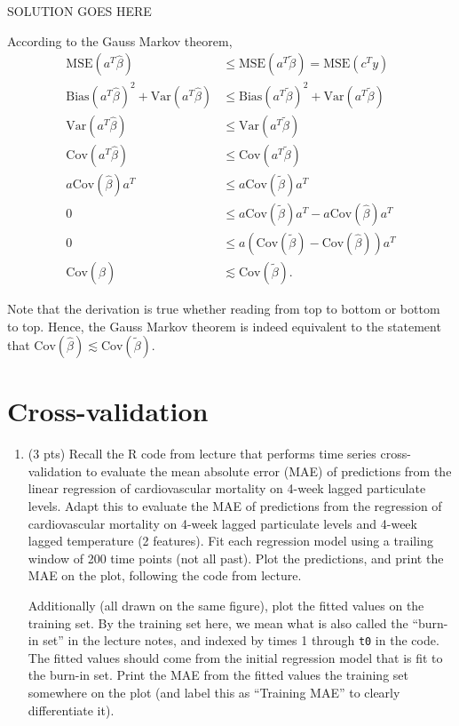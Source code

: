 \documentclass[
]{article}
\begin{document}
SOLUTION GOES HERE

According to the Gauss Markov theorem, \begin{align*}
  \mathrm{MSE}(a^T\hat{\beta}) & \le \mathrm{MSE}(a^T\tilde{\beta}) = \mathrm{MSE}(c^Ty) \\
  \mathrm{Bias}(a^T\hat\beta)^2 + \mathrm{Var}(a^T\hat{\beta}) & \le \mathrm{Bias}(a^T\tilde{\beta})^2 + \mathrm{Var}(a^T\tilde{\beta}) \\
  \mathrm{Var}(a^T\hat{\beta}) & \le \mathrm{Var}(a^T\tilde{\beta}) \\
  \mathrm{Cov}(a^T\hat{\beta}) & \le \mathrm{Cov}(a^T\tilde{\beta}) \\
  a\mathrm{Cov}(\hat{\beta})a^T & \le a\mathrm{Cov}(\tilde{\beta})a^T \\
  0 & \le a\mathrm{Cov}(\tilde{\beta})a^T - a\mathrm{Cov}(\hat{\beta})a^T \\
  0 & \le a\left(\mathrm{Cov}(\tilde{\beta}) - \mathrm{Cov}(\hat{\beta})\right)a^T \\
  \mathrm{Cov}(\hat\beta) & \lesssim \mathrm{Cov}(\tilde\beta).
\end{align*}

Note that the derivation is true whether reading from top to bottom or
bottom to top. Hence, the Gauss Markov theorem is indeed equivalent to
the statement that
\(\mathrm{Cov}(\hat\beta) \lesssim \mathrm{Cov}(\tilde\beta)\).

\hypertarget{cross-validation}{%
\section{Cross-validation}\label{cross-validation}}

\begin{enumerate}
\def\labelenumi{\arabic{enumi}.}
\setcounter{enumi}{11}
\item
  (3 pts) Recall the R code from lecture that performs time series
  cross-validation to evaluate the mean absolute error (MAE) of
  predictions from the linear regression of cardiovascular mortality on
  4-week lagged particulate levels. Adapt this to evaluate the MAE of
  predictions from the regression of cardiovascular mortality on 4-week
  lagged particulate levels and 4-week lagged temperature (2 features).
  Fit each regression model using a trailing window of 200 time points
  (not all past). Plot the predictions, and print the MAE on the plot,
  following the code from lecture.

  Additionally (all drawn on the same figure), plot the fitted values on
  the training set. By the training set here, we mean what is also
  called the ``burn-in set'' in the lecture notes, and indexed by times
  1 through \texttt{t0} in the code. The fitted values should come from
  the initial regression model that is fit to the burn-in set. Print the
  MAE from the fitted values the training set somewhere on the plot (and
  label this as ``Training MAE'' to clearly differentiate it).
\end{enumerate}
\end{document}

